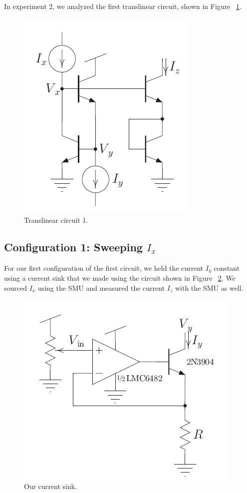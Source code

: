 \documentclass{article}
\begin{document}
In experiment 2, we analyzed the first translinear circuit, shown in Figure ~\ref{fig:tl1}.

\begin{figure}[H]
\begin{center}
\includegraphics[scale=.5]{tl1.png}
\caption{Translinear circuit 1.}
\label{fig:tl1}
\end{center}
\end{figure}

\subsection*{Configuration 1: Sweeping $I_x$}

For our first configuration of the first circuit, we held the current $I_y$ constant using a current sink that we made using the circuit shown in Figure ~\ref{fig:sink}.  We sourced $I_x$ using the SMU and measured the current $I_z$ with the SMU as well.

\begin{figure}[H]
\begin{center}
\includegraphics[scale=.5]{sink.png}
\caption{Our current sink.}
\label{fig:sink}
\end{center}
\end{figure}
\end{document}

